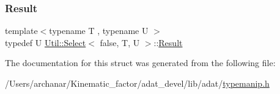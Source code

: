 \subsubsection{\texorpdfstring{Result}{Result}\hspace{0.1cm}{\footnotesize\ttfamily [2/2]}}
{\footnotesize\ttfamily template$<$typename T , typename U $>$ \\
typedef U \mbox{\hyperlink{structUtil_1_1Select}{Util\+::\+Select}}$<$ false, T, U $>$\+::\mbox{\hyperlink{structUtil_1_1Select_3_01false_00_01T_00_01U_01_4_a0fae7c144e474e3297046018b97cd287}{Result}}}



The documentation for this struct was generated from the following file\+:\begin{DoxyCompactItemize}
\item 
/\+Users/archanar/\+Kinematic\+\_\+factor/adat\+\_\+devel/lib/adat/\mbox{\hyperlink{lib_2adat_2typemanip_8h}{typemanip.\+h}}\end{DoxyCompactItemize}

